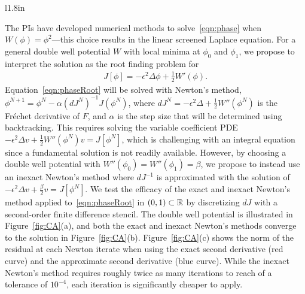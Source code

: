 \begin{wrapfigure}[28]{l}{1.8in}
  \vspace{-8pt}
  \centering
   
  \caption{\label{fig:CA} \footnotesize (a) A double well potential. (b)
  The solution of the one-dimensional phase
  transition~\eqref{eqn:phase}. (c) The convergence of exact and inexact
  Newton's methods.}
\end{wrapfigure}
The PIs have developed numerical methods to solve~\eqref{eqn:phase} when
$W(\phi) = \phi^2$---this choice results in the linear screened Laplace
equation. For a general double well potential $W$ with local minima at
$\phi_0$ and $\phi_1$, we propose to interpret the solution as the root
finding problem for
\begin{align}
  \label{eqn:phaseRoot}
  J[\phi] = -\epsilon^2 \Delta \phi + \tfrac{1}{2}W'(\phi).
\end{align}
Equation~\eqref{eqn:phaseRoot} will be solved with Newton's method,
$\phi^{N+1} = \phi^{N} - \alpha (dJ^N)^{-1} J(\phi^N)$, where $dJ^N =
-\epsilon^2 \Delta + \tfrac{1}{2}W''(\phi^N)$ is the Fr\'{e}chet
derivative of $F$, and $\alpha$ is the step size that will be determined
using backtracking. This requires solving the variable coefficient PDE
$-\epsilon^2 \Delta v + \tfrac{1}{2}W''(\phi^{N}) v = J[\phi^N]$, which
is challenging with an integral equation since a fundamental solution is
not readily available. However, by choosing a double well potential with
$W''(\phi_0) = W''(\phi_1) = \beta$, we propose to instead use an
inexact Newton's method where $dJ^{-1}$ is approximated with the
solution of $-\epsilon^2 \Delta v + \tfrac{\beta}{2} v = J[\phi^N]$. We
test the efficacy of the exact and inexact Newton's method applied
to~\eqref{eqn:phaseRoot} in $(0,1) \subset \mathbb{R}$ by discretizing $dJ$
with a second-order finite difference stencil. The double well potential
is illustrated in Figure~\ref{fig:CA}(a), and both the exact and inexact
Newton's methods converge to the solution in Figure~\ref{fig:CA}(b).
Figure~\ref{fig:CA}(c) shows the norm of the residual at each Newton
iterate when using the exact second derivative (red curve) and the
approximate second derivative (blue curve). While the inexact Newton's
method requires roughly twice as many iterations to reach of a tolerance
of $10^{-4}$, each iteration is significantly cheaper to apply.

